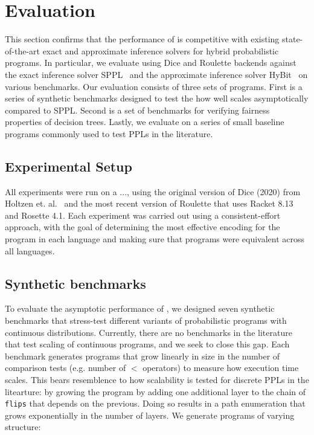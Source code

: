\section{Evaluation}\label{sec:evaluation}

This section confirms that the performance of \Slice{} is competitive with existing state-of-the-art exact and approximate inference solvers for hybrid probabilistic programs. In particular, we evaluate \Slice{} using Dice and Roulette backends against the exact inference solver SPPL~\cite{Saad2021SPPL} and the approximate inference solver HyBit~\cite{Garg2024BitBlast} on various benchmarks. Our evaluation consists of three sets of programs. First is a series of synthetic benchmarks designed to test the how well \Slice{} scales asymptotically compared to SPPL. Second is a set of benchmarks for verifying fairness properties of decision trees. Lastly, we evaluate \Slice{} on a series of small baseline programs commonly used to test PPLs in the literature. 

\subsection{Experimental Setup}\label{sec:experimenal-setup}
All experiments were run on a ..., using the original version of Dice (2020) from Holtzen et. al.~\cite{Holtzen2020Dice} and the most recent version of Roulette that uses Racket 8.13 and Rosette 4.1. Each experiment was carried out using a consistent-effort approach, with the goal of determining the most effective encoding for the program in each language and making sure that programs were equivalent across all languages. 

\subsection{Synthetic benchmarks}\label{sec:synthetic-benchmarks}
To evaluate the asymptotic performance of \Slice{}, we designed seven synthetic benchmarks that stress-test different variants of probabilistic programs with continuous distributions. Currently, there are no benchmarks in the literature that test scaling of continuous programs, and we seek to close this gap. Each benchmark generates programs that grow linearly in size in the number of comparison tests (e.g. number of $<$ operators) to measure how execution time scales. This bears resemblence to how scalability is tested for discrete PPLs in the litearture: by growing the program by adding one additional layer to the chain of \texttt{flips} that depends on the previous. Doing so results in a path enumeration that grows exponentially in the number of layers. We generate programs of varying structure:

